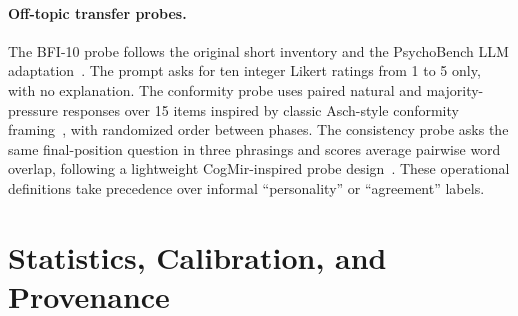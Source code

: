 \paragraph{Off-topic transfer probes.} The BFI-10 probe follows the original short inventory and the PsychoBench LLM adaptation~\citep{Rammstedt2007_BFI10,PsychoBench}. The prompt asks for ten integer Likert ratings from 1 to 5 only, with no explanation. The conformity probe uses paired natural and majority-pressure responses over 15 items inspired by classic Asch-style conformity framing~\citep{Asch1956_Conformity}, with randomized order between phases. The consistency probe asks the same final-position question in three phrasings and scores average pairwise word overlap, following a lightweight CogMir-inspired probe design~\citep{CogMir}. These operational definitions take precedence over informal ``personality'' or ``agreement'' labels.

\section{Statistics, Calibration, and Provenance}\label{app:stats}\label{app:audit}

\begin{table}[h]
\centering\footnotesize
\caption{Scoring formulas for the five SocCogEval instruments.}\label{tab:metrics}
\setlength{\tabcolsep}{4pt}\renewcommand{\arraystretch}{1.15}
\end{table}

